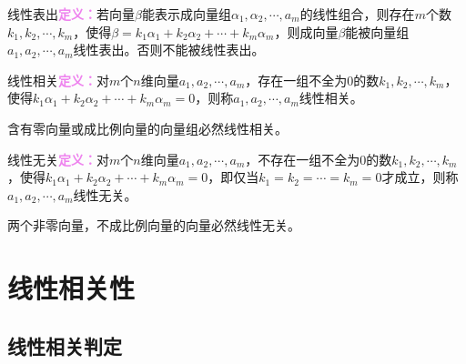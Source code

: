 \documentclass[UTF8, 12pt]{ctexart}
\begin{document}
线性表出\textcolor{violet}{\textbf{定义：}}若向量$\beta$能表示成向量组$\alpha_1,\alpha_2,\cdots,a_m$的线性组合，则存在$m$个数$k_1,k_2,\cdots,k_m$，使得$\beta=k_1\alpha_1+k_2\alpha_2+\cdots+k_m\alpha_m$，则成向量$\beta$能被向量组$a_1,a_2,\cdots,a_m$线性表出。否则不能被线性表出。

线性相关\textcolor{violet}{\textbf{定义：}}对$m$个$n$维向量$a_1,a_2,\cdots,a_m$，存在一组不全为0的数$k_1,k_2,\cdots,k_m$，使得$k_1\alpha_1+k_2\alpha_2+\cdots+k_m\alpha_m=0$，则称$a_1,a_2,\cdots,a_m$线性相关。

含有零向量或成比例向量的向量组必然线性相关。

线性无关\textcolor{violet}{\textbf{定义：}}对$m$个$n$维向量$a_1,a_2,\cdots,a_m$，不存在一组不全为0的数$k_1,k_2,\cdots,k_m$，使得$k_1\alpha_1+k_2\alpha_2+\cdots+k_m\alpha_m=0$，即仅当$k_1=k_2=\cdots=k_m=0$才成立，则称$a_1,a_2,\cdots,a_m$线性无关。

两个非零向量，不成比例向量的向量必然线性无关。

\section{线性相关性}

\subsection{线性相关判定}
\end{document}
